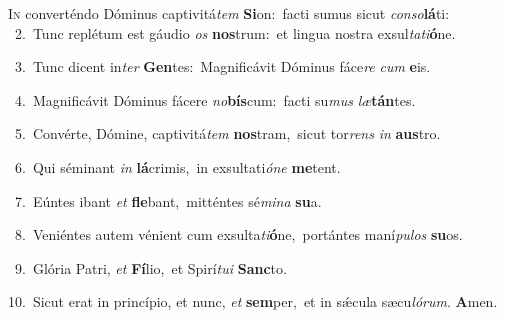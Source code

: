 \lettrine{\initial\textcolor{\initialcolor}{I}}{n} converténdo Dóminus captivitá\textit{tem} \textbf{Si}\-on:~\star facti sumus sicut \textit{con}\-\textit{so}\textbf{lá}ti:\\
{\numbfont\textcolor{\numbcolor}{~2.}}~Tunc replétum est gáudio \textit{os} \textbf{nos}\-trum:~\star et lingua nostra exsul\-\textit{ta}\-\textit{ti}\textbf{ó}ne.\par
{\numbfont\textcolor{\numbcolor}{~3.}}~Tunc dicent in\textit{ter} \textbf{Gen}\-tes:~\star Magnificávit Dóminus fáce\textit{re} \textit{cum} \textbf{e}\-is.\par
{\numbfont\textcolor{\numbcolor}{~4.}}~Magnificávit Dóminus fácere \textit{no}\-\textbf{bís}cum:~\star facti su\textit{mus} \textit{læ}\-\textbf{tán}tes.\par
{\numbfont\textcolor{\numbcolor}{~5.}}~Convérte, Dómine, captivitá\textit{tem} \textbf{nos}\-tram,~\star sicut tor\textit{rens} \textit{in} \textbf{aus}\-tro.\par
{\numbfont\textcolor{\numbcolor}{~6.}}~Qui séminant \textit{in} \textbf{lá}\-crimis,~\star in exsultati\-\textit{ó}\-\textit{ne} \textbf{me}\-tent.\par
{\numbfont\textcolor{\numbcolor}{~7.}}~Eúntes ibant \textit{et} \textbf{fle}\-bant,~\star mitténtes sé\-\textit{mi}\-\textit{na} \textbf{su}\-a.\par
{\numbfont\textcolor{\numbcolor}{~8.}}~Veniéntes autem vénient cum exsulta\-\textit{ti}\-\textbf{ó}ne,~\star portántes maní\-\textit{pu}\-\textit{los} \textbf{su}\-os.\par
{\numbfont\textcolor{\numbcolor}{~9.}}~Glória Patri, \textit{et} \textbf{Fí}\-lio,~\star et Spirí\-\textit{tu}\-\textit{i} \textbf{Sanc}\-to.\par
{\numbfont\textcolor{\numbcolor}{10.}}~Sicut erat in princípio, et nunc, \textit{et} \textbf{sem}\-per,~\star et in sǽcula sæcu\-\textit{ló}\-\textit{rum}. \textbf{A}\-men.\par
